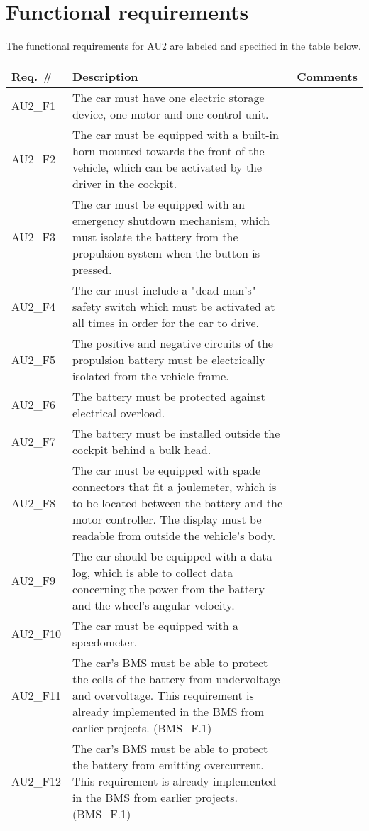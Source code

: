 \section{Functional requirements}
The functional requirements for AU2 are labeled and specified in the table below.

\begin{longtable}{|p{2 cm}|p{7 cm}|p{4 cm}|}
		\hline
		\textbf{Req. \#} & \textbf{Description} & \textbf{Comments} \\\hline
		AU2\_F1		& The car must have one electric storage device, one motor and one control unit. &   \\\hline
		AU2\_F2		& The car must be equipped with a built-in horn mounted towards the front of the vehicle, which can be activated by the driver in the cockpit. &   \\\hline
		AU2\_F3		& The car must be equipped with an emergency shutdown mechanism, which must isolate the battery from the propulsion system when the button is pressed. &   \\\hline
		AU2\_F4		& The car must include a "dead man's" safety switch which must be activated at all times in order for the car to drive. &   \\\hline
		AU2\_F5	& The positive and negative circuits of the propulsion battery  must be electrically isolated from the vehicle frame. &   \\\hline
		AU2\_F6	& 
		The battery must be protected against electrical overload. &   \\\hline
		AU2\_F7		& The battery must be installed outside the cockpit behind a bulk head. &   \\\hline
		AU2\_F8	& The car must be equipped with spade connectors that fit a joulemeter, which is to be located between the battery and the motor controller. The display must be readable from outside the vehicle's body. &   \\\hline
		AU2\_F9	& The car should be equipped with a data-log, which is able to collect data concerning the power from the battery and the wheel's angular velocity. &   \\\hline
		AU2\_F10	& The car must be equipped with a speedometer. &   \\\hline
		AU2\_F11	& The car's BMS must be able to protect the cells of the battery from undervoltage and overvoltage. This requirement is already implemented in the BMS from earlier projects. (BMS\_F.1) \fxnote{reference to 2013BMS Documentation} &   \\\hline
		AU2\_F12	& The car's BMS must be able to protect the battery from emitting overcurrent. This requirement is already implemented in the BMS from earlier projects. (BMS\_F.1) \fxnote{reference to 2013BMS Documentation} &   \\\hline

\end{longtable}
